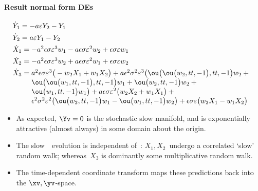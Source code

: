 \paragraph{Result normal form DEs}
\begin{align*}&
\dot Y_{1}=-a \eps Y_{2}-Y_{1}
\\&
\dot Y_{2}=a \eps Y_{1}-Y_{2}
\\&
\dot X_{1}=\ParMath{-a^{2} \epsilon  \sigma  \eps^{3} w_{1}-a \epsilon  \sigma  
\eps^{2} w_{2}+\epsilon  \sigma  \eps w_{1}
}
\\&
\dot X_{2}=\ParMath{-a^{2} \epsilon  \sigma  \eps^{3} w_{2}+a \epsilon  \sigma  
\eps^{2} w_{1}+\epsilon  \sigma  \eps w_{2}
}
\\&
\dot X_{3}=\ParMath{a^{2} \epsilon  \sigma  \eps^{3} \big(-w_{2} X_{1}+w_{1} X_{2
}\big)+a \epsilon ^{2} \sigma ^{2} \eps^{3} \big(\ou\big(\ou\big(w_{2},
tt,-1\big),tt,-1\big) w_{2}+\ou\big(\ou\big(w_{1},tt,-1\big),tt,-1\big) 
w_{1}+\ou\big(w_{2},tt,-1\big) w_{2}+\ou\big(w_{1},tt,-1\big) w_{1}\big)
+a \epsilon  \sigma  \eps^{2} \big(w_{2} X_{2}+w_{1} X_{1}\big)+
\epsilon ^{2} \sigma ^{2} \eps^{2} \big(\ou\big(w_{2},tt,-1\big) w_{1}-
\ou\big(w_{1},tt,-1\big) w_{2}\big)+\epsilon  \sigma  \eps \big(w_{2} X_
{1}-w_{1} X_{2}\big)
}
\end{align*}
\begin{itemize}
\item As expected, \(\Yv=0\) is the stochastic slow manifold, and is exponentially attractive (almost always) in some domain about the origin.
\item The slow~\Xv\ evolution is independent of~\Yv: \(X_1,X_2\)~undergo a correlated `slow' random walk; whereas~\(X_3\) is dominantly some multiplicative random walk.
\item The time-dependent coordinate transform maps these predictions back into the \(\xv,\yv\)-space.
\end{itemize}


